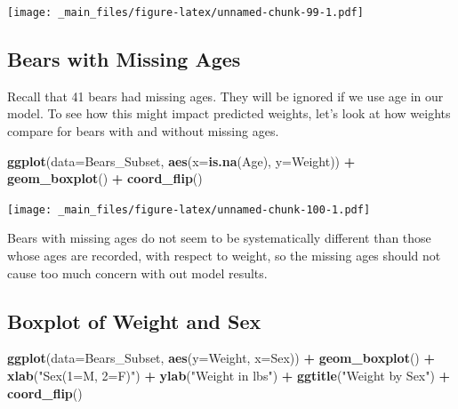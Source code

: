 \documentclass[]{book}
\newenvironment{Shaded}{\begin{snugshade}}{\end{snugshade}}
\newcommand{\KeywordTok}[1]{\textcolor[rgb]{0.13,0.29,0.53}{\textbf{#1}}}
\newcommand{\DataTypeTok}[1]{\textcolor[rgb]{0.13,0.29,0.53}{#1}}
\newcommand{\StringTok}[1]{\textcolor[rgb]{0.31,0.60,0.02}{#1}}
\newcommand{\OperatorTok}[1]{\textcolor[rgb]{0.81,0.36,0.00}{\textbf{#1}}}
\newcommand{\NormalTok}[1]{#1}
\begin{document}
\texttt{[image: \_main\_files/figure-latex/unnamed-chunk-99-1.pdf]}

\subsection{Bears with Missing Ages}\label{bears-with-missing-ages}

Recall that 41 bears had missing ages. They will be ignored if we use
age in our model. To see how this might impact predicted weights, let's
look at how weights compare for bears with and without missing ages.

\begin{Shaded}
\begin{Highlighting}[]
\KeywordTok{ggplot}\NormalTok{(}\DataTypeTok{data=}\NormalTok{Bears_Subset, }\KeywordTok{aes}\NormalTok{(}\DataTypeTok{x=}\KeywordTok{is.na}\NormalTok{(Age), }\DataTypeTok{y=}\NormalTok{Weight)) }\OperatorTok{+}\StringTok{ }\KeywordTok{geom_boxplot}\NormalTok{() }\OperatorTok{+}\StringTok{ }\KeywordTok{coord_flip}\NormalTok{()}
\end{Highlighting}
\end{Shaded}

\texttt{[image: \_main\_files/figure-latex/unnamed-chunk-100-1.pdf]}

Bears with missing ages do not seem to be systematically different than
those whose ages are recorded, with respect to weight, so the missing
ages should not cause too much concern with out model results.

\subsection{Boxplot of Weight and
Sex}\label{boxplot-of-weight-and-sex-1}

\begin{Shaded}
\begin{Highlighting}[]
\KeywordTok{ggplot}\NormalTok{(}\DataTypeTok{data=}\NormalTok{Bears_Subset, }\KeywordTok{aes}\NormalTok{(}\DataTypeTok{y=}\NormalTok{Weight, }\DataTypeTok{x=}\NormalTok{Sex)) }\OperatorTok{+}\StringTok{ }
\StringTok{  }\KeywordTok{geom_boxplot}\NormalTok{() }\OperatorTok{+}\StringTok{ }
\StringTok{  }\KeywordTok{xlab}\NormalTok{(}\StringTok{"Sex(1=M, 2=F)"}\NormalTok{) }\OperatorTok{+}\StringTok{ }\KeywordTok{ylab}\NormalTok{(}\StringTok{"Weight in lbs"}\NormalTok{) }\OperatorTok{+}\StringTok{ }\KeywordTok{ggtitle}\NormalTok{(}\StringTok{"Weight by Sex"}\NormalTok{) }\OperatorTok{+}\StringTok{ }\KeywordTok{coord_flip}\NormalTok{()}
\end{Highlighting}
\end{Shaded}
\end{document}
